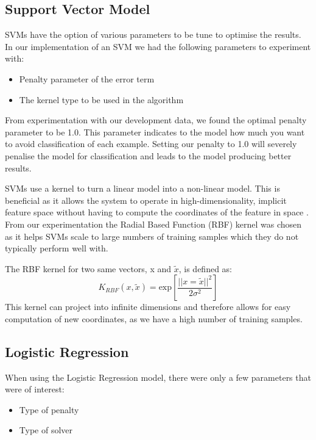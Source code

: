 \documentclass[bsc,frontabs,twoside,singlespacing,parskip,deptreport]{infthesis}     %
\begin{document}
 \subsection{Support Vector Model}
 SVMs have the option of various parameters to be tune to optimise the results.
 In our implementation of an SVM we had the following parameters to experiment with:
 \begin{itemize}
 \item Penalty parameter of the error term
 \item The kernel type to be used in the algorithm
 \end{itemize}

 From experimentation with our development data, we found the optimal penalty parameter to be 1.0.
 This parameter indicates to the model how much you want to avoid classification of each example.
 Setting our penalty to 1.0 will severely penalise the model for classification and leads to the model producing
 better results.

 SVMs use a kernel to turn a linear model into a non-linear model. This is beneficial as it allows the system
 to operate in high-dimensionality, implicit feature space without having to compute the coordinates of the feature
 in space \cite{hofmann2008kernel}.
 From our experimentation the Radial Based Function (RBF) kernel was chosen as it helps SVMs scale to large numbers of
 training samples which they do not typically perform well with.

 The RBF kernel for two same vectors, x and $\tilde{x}$, is defined as:
 \begin{equation}
   K_{RBF} (x, \tilde{x}) = \text{exp}[ \frac{||x =\tilde{x}||^2}{2\sigma^2}]\nonumber
 \end{equation}
\cite{hofmann2008kernel}
 This kernel can project into infinite dimensions and therefore allows for easy computation of new coordinates, as
 we have a high number of training samples.
 
 \subsection{Logistic Regression}\label{sec:log-reg}
 When using the Logistic Regression model, there were only a few parameters that were of interest:
 \begin{itemize}
   \item Type of penalty
   \item Type of solver
 \end{itemize}
\end{document}
